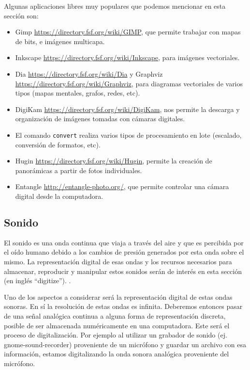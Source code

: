 \documentclass[12pt]{article}
\begin{document}
Algunas aplicaciones libres muy populares que podemos mencionar en esta sección son: 
\begin{itemize}
\item Gimp \url{https://directory.fsf.org/wiki/GIMP}, que permite 
trabajar con mapas de bits, e imágenes multicapa. 
\item Inkscape \url{https://directory.fsf.org/wiki/Inkscape}, 
para imágenes vectoriales. 
\item Dia \url{https://directory.fsf.org/wiki/Dia} y Graphviz 
\url{https://directory.fsf.org/wiki/Graphviz}, para diagramas vectoriales de 
varios tipos (mapas mentales, grafos, redes, etc). 
\item DigiKam \url{https://directory.fsf.org/wiki/DigiKam}, nos permite la descarga y organización de 
imágenes tomadas con cámaras digitales. 
\item El comando {\tt convert} realiza varios tipos de procesamiento
en lote (escalado, conversión de formatos, etc). 
\item Hugin \url{https://directory.fsf.org/wiki/Hugin},  
permite la creación de panorámicas a partir de fotos individuales.  
\item Entangle \url{http://entangle-photo.org/}, que permite controlar una cámara 
digital desde la computadora.
\end{itemize}


\subsection*{Sonido}

El sonido es una onda continua que viaja a través del aire y que es percibida por el 
oído humano debido a los cambios de presión generados por esta onda sobre el mismo. 
La representación digital de esas ondas y los recursos necesarios para almacenar, 
reproducir y manipular estos sonidos serán de interés en esta sección (en inglés ``digitize''). . 

Uno de los aspectos a considerar será la representación digital de estas ondas sonoras.
En sí la resolución de estas ondas es infinita. Deberemos entonces pasar de una 
señal analógica continua a alguna forma de representación discreta, posible de ser  
almacenada numéricamente en una computadora. Este será el proceso de digitalización. 
Por ejemplo al utilizar un grabador de sonido (ej. gnome-sound-recorder) proveniente 
de un micrófono y guardar un archivo con esa información, estamos digitalizando la 
onda sonora analógica proveniente del micrófono. 
\end{document}
